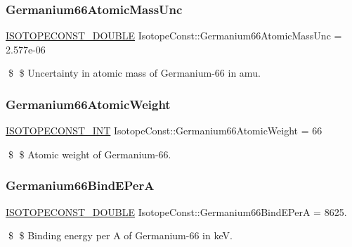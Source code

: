 \subsubsection{\texorpdfstring{Germanium66\+Atomic\+Mass\+Unc}{Germanium66AtomicMassUnc}}
{\footnotesize\ttfamily \mbox{\hyperlink{group___isotope_const-_macros_ga8f45a7272ce02c0b4c65c44636ed719a}{I\+S\+O\+T\+O\+P\+E\+C\+O\+N\+S\+T\+\_\+\+D\+O\+U\+B\+LE}} Isotope\+Const\+::\+Germanium66\+Atomic\+Mass\+Unc = 2.\+577e-\/06}

\$ \$ Uncertainty in atomic mass of Germanium-\/66 in amu. \mbox{\label{group___isotope_const-_germanium-_ge66_ga5a79a5c18a43dc8fc0f6c01451fb5fa7}} 
\subsubsection{\texorpdfstring{Germanium66\+Atomic\+Weight}{Germanium66AtomicWeight}}
{\footnotesize\ttfamily \mbox{\hyperlink{group___isotope_const-_macros_ga5f18360b3e99483a35c32d789e62621c}{I\+S\+O\+T\+O\+P\+E\+C\+O\+N\+S\+T\+\_\+\+I\+NT}} Isotope\+Const\+::\+Germanium66\+Atomic\+Weight = 66}

\$ \$ Atomic weight of Germanium-\/66. \mbox{\label{group___isotope_const-_germanium-_ge66_gae30734f23740c9402bd93a40ca09a540}} 
\subsubsection{\texorpdfstring{Germanium66\+Bind\+E\+PerA}{Germanium66BindEPerA}}
{\footnotesize\ttfamily \mbox{\hyperlink{group___isotope_const-_macros_ga8f45a7272ce02c0b4c65c44636ed719a}{I\+S\+O\+T\+O\+P\+E\+C\+O\+N\+S\+T\+\_\+\+D\+O\+U\+B\+LE}} Isotope\+Const\+::\+Germanium66\+Bind\+E\+PerA = 8625.}

\$ \$ Binding energy per A of Germanium-\/66 in keV. \mbox{\label{group___isotope_const-_germanium-_ge66_gab543125467c26ff35900fa6669d9f9ea}} 
